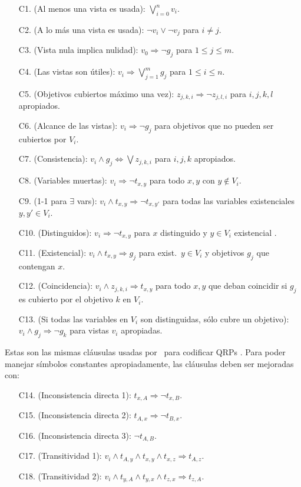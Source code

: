 \begin{enumerate}[C10.]
\item[C1.] (Al menos una vista es usada): $\bigvee_{i=0}^n v_i$.
\item[C2.] (A lo más una vista es usada): $\neg v_i\lor\neg v_j$ para $i\neq j$.
\item[C3.] (Vista nula implica nulidad): $v_0 \Rightarrow \neg g_j$ para $1\leq j\leq m$.
\item[C4.] (Las vistas son útiles): $v_i \Rightarrow \bigvee_{j=1}^m g_j$ para $1\leq i\leq n$.
\item[C5.] (Objetivos cubiertos máximo una vez): $z_{j,k,i} \Rightarrow \neg z_{j,l,i}$ para $i,j,k,l$ apropiados.
\item[C6.] (Alcance de las vistas): $v_i \Rightarrow \neg g_j$ para objetivos que no pueden ser cubiertos por $V_i$.
\item[C7.] (Consistencia): $v_i \land g_j \Leftrightarrow \bigvee z_{j,k,i}$ para $i,j,k$ apropiados.
\item[C8.] (Variables muertas): $v_i \Rightarrow \neg t_{x,y}$ para todo $x,y$ con $y\notin V_i$.
\item[C9.] (1-1 para $\exists$ vars): $v_i \land t_{x,y} \Rightarrow \neg t_{x,y'}$ para todas las variables existenciales $y,y'\in V_i$.
\item[C10.] (Distinguidos): $v_i \Rightarrow \neg t_{x,y}$ para $x$ distinguido y $y\in V_i$ existencial .
\item[C11.] (Existencial): $v_i\land t_{x,y}\Rightarrow g_j$ para exist.\ $y\in V_i$ y objetivos $g_j$ que contengan $x$.
\item[C12.] (Coincidencia): $v_i\land z_{j,k,i} \Rightarrow t_{x,y}$ para todo
$x,y$ que deban coincidir si $g_j$ es cubierto por el objetivo $k$ en $V_i$.
\item[C13.] (Si todas las variables en $V_i$ son distinguidas, sólo cubre un objetivo): $v_i \land g_j \Rightarrow \neg g_k$ para vistas $v_i$ apropiadas.
\end{enumerate}

Estas son las mismas cláusulas usadas por \mcdsat\ para codificar QRPs \cite{arvelo:aaai06}.
Para poder manejar símbolos constantes apropiadamente, las cláusulas deben ser
mejoradas con:

\begin{enumerate}[C10.]
\item[C14.] (Inconsistencia directa 1): $t_{x,A} \Rightarrow \neg t_{x,B}$.
\item[C15.] (Inconsistencia directa 2): $t_{A,x} \Rightarrow \neg t_{B,x}$.
\item[C16.] (Inconsistencia directa 3): $\neg t_{A,B}$.
\item[C17.] (Transitividad 1): $v_i\land t_{A,y}\land t_{x,y}\land t_{x,z}\Rightarrow t_{A,z}$.
\item[C18.] (Transitividad 2): $v_i\land t_{y,A}\land t_{y,x}\land t_{z,x}\Rightarrow t_{z,A}$.
\end{enumerate}

